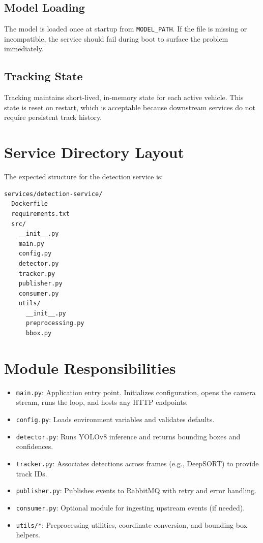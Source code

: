 \documentclass[11pt]{article}
\begin{document}
\subsection*{Model Loading}
The model is loaded once at startup from \texttt{MODEL\_PATH}. If the file is missing or incompatible, the service should fail during boot to surface the problem immediately.

\subsection*{Tracking State}
Tracking maintains short-lived, in-memory state for each active vehicle. This state is reset on restart, which is acceptable because downstream services do not require persistent track history.

\section{Service Directory Layout}
The expected structure for the detection service is:

\begin{lstlisting}[basicstyle=\ttfamily\small]
services/detection-service/
  Dockerfile
  requirements.txt
  src/
    __init__.py
    main.py
    config.py
    detector.py
    tracker.py
    publisher.py
    consumer.py
    utils/
      __init__.py
      preprocessing.py
      bbox.py
\end{lstlisting}

\section{Module Responsibilities}
\begin{itemize}
  \item \texttt{main.py}: Application entry point. Initializes configuration, opens the camera stream, runs the loop, and hosts any HTTP endpoints.
  \item \texttt{config.py}: Loads environment variables and validates defaults.
  \item \texttt{detector.py}: Runs YOLOv8 inference and returns bounding boxes and confidences.
  \item \texttt{tracker.py}: Associates detections across frames (e.g., DeepSORT) to provide track IDs.
  \item \texttt{publisher.py}: Publishes events to RabbitMQ with retry and error handling.
  \item \texttt{consumer.py}: Optional module for ingesting upstream events (if needed).
  \item \texttt{utils/*}: Preprocessing utilities, coordinate conversion, and bounding box helpers.
\end{itemize}
\end{document}
